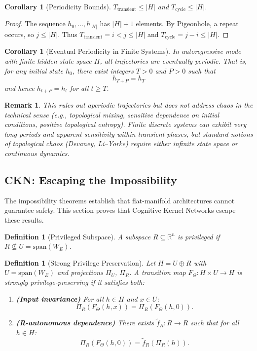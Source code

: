 \documentclass[11pt,a4paper]{article}
\newtheorem{corollary}[theorem]{Corollary}
\newtheorem{definition}[theorem]{Definition}
\newtheorem*{remark}{Remark}
\begin{document}
\begin{corollary}[Periodicity Bounds]
$T_{\text{transient}} \leq |H|$ and $T_{\text{cycle}} \leq |H|$.
\end{corollary}

\begin{proof}
The sequence $h_0, \ldots, h_{|H|}$ has $|H| + 1$ elements. By Pigeonhole, a repeat occurs, so $j \leq |H|$. Thus $T_{\text{transient}} = i < j \leq |H|$ and $T_{\text{cycle}} = j - i \leq |H|$.
\end{proof}

\begin{corollary}[Eventual Periodicity in Finite Systems]
\label{cor:eventual-periodicity}
In autoregressive mode with finite hidden state space $H$, all trajectories are eventually periodic. That is, for any initial state $h_0$, there exist integers $T > 0$ and $P > 0$ such that
\[
h_{T+P} = h_T
\]
and hence $h_{t+P} = h_t$ for all $t \geq T$.
\end{corollary}

\begin{remark}
This rules out aperiodic trajectories but does not address chaos in the technical sense (e.g., topological mixing, sensitive dependence on initial conditions, positive topological entropy). Finite discrete systems can exhibit very long periods and apparent sensitivity within transient phases, but standard notions of topological chaos (Devaney, Li--Yorke) require either infinite state space or continuous dynamics.
\end{remark}

\subsection{CKN: Escaping the Impossibility}

The impossibility theorems establish that flat-manifold architectures cannot guarantee safety. This section proves that Cognitive Kernel Networks escape these results.

\begin{definition}[Privileged Subspace]
A subspace $R \subseteq \mathbb{R}^n$ is privileged if $R \not\subseteq U = \text{span}(W_E)$.
\end{definition}

\begin{definition}[Strong Privilege Preservation]
\label{def:strong-privilege}
Let $H = U \oplus R$ with $U = \text{span}(W_E)$ and projections $\Pi_U$, $\Pi_R$. A transition map $F_\Theta: H \times U \to H$ is \emph{strongly privilege-preserving} if it satisfies both:
\begin{enumerate}
    \item \textbf{(Input invariance)} For all $h \in H$ and $x \in U$:
    \[
    \Pi_R(F_\Theta(h, x)) = \Pi_R(F_\Theta(h, 0)).
    \]
    \item \textbf{(R-autonomous dependence)} There exists $\tilde{f}_R: R \to R$ such that for all $h \in H$:
    \[
    \Pi_R(F_\Theta(h, 0)) = \tilde{f}_R(\Pi_R(h)).
    \]
\end{enumerate}
\end{definition}
\end{document}
